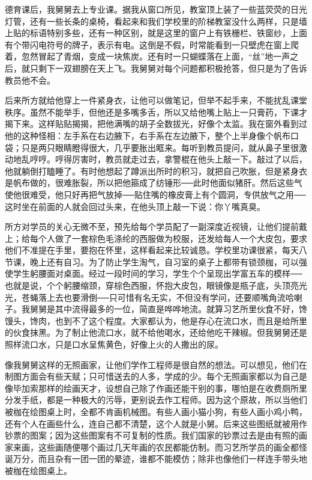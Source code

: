 德育课后，我舅舅去上专业课。据我从窗口所见，教室顶上装了一些蓝荧荧的日光灯管，还有一些长条的桌椅，看起来和我们学校里的阶梯教室没什么两样，只是墙上贴的标语特别多些，还有一种区别，就是这里的窗户上有铁栅栏、铁窗纱，上面有个带闪电符号的牌子，表示有电。这倒是不假，时常能看到一只壁虎在窗上爬着，忽然冒起了青烟，变成一块焦炭。还有时一只蝴蝶落在上面，“丝”地一声之后，就只剩下一双翅膀在天上飞。我舅舅对每个问题都积极抢答，但只是为了告诉教员他不会。 

后来所方就给他穿上一件紧身衣，让他可以做笔记，但举不起手来，不能扰乱课堂秩序。虽然不能举手，但他还是多嘴多舌，所以又给他嘴上贴上一只膏药，下课才揭下来。这样贴贴揭揭，把他满嘴的胡子全数拔光，好像个太监。我在窗外看到过他的这种怪相：左手系在右边腋下，右手系在左边腋下，整个上半身像个帆布口袋；只是两只眼睛瞪得很大，几乎要胀出眶来。每听到教员提问，就从鼻子里很激动地乱哼哼。哼得厉害时，教员就走过去，拿警棍在他头上敲一下。敲过了以后，他就躺倒打瞌睡了。有时他想起了蹲派出所时的积习，就把自己吹胀，但是紧身衣是帆布做的，很难胀裂，所以把他箍成了纺锤形──此时他面似猪肝。然后这些气使他很难受，他只好再把气放掉──贴住嘴的橡皮膏上有个圆洞，专供放气之用──这时坐在前面的人就会回过头来，在他头顶上敲一下说：你丫嘴真臭。 

所方对学员的关心无微不至，预先给每个学员配了一副深度近视镜，让他们提前戴上；给每个人做了一套棕色毛涤纶的西服做为校服，还发给每人一个大皮包，要求他们不准提在手里，要抱在怀里，这样看起来比较诚恳。学校里功课很紧，每天八节课，晚上还有自习。为了防止学生淘气，自习室的桌子上都带有锁颈枷，可以强使学生躬腰面对桌面。经过一段时间的学习，学生个个呈现出学富五车的模样──也就是说，个个躬腰缩颈，穿棕色西服，怀抱大皮包，眼镜像是瓶子底，头顶亮光光，苍蝇落上去也要滑倒──只可惜有名无实，不但没有学问，还要顺嘴角流哈喇子。我舅舅是其中流得最多的一位，简直是哗哗地流。就算习艺所里伙食不好，馋馒头，馋肉，也到不了这个程度。大家都认为，他是存心在流口水，而且是给所里的伙食抹黑。为了制止他流口水，就不给他喝水，还给他吃干辣椒。但我舅舅还是照样流口水，只是口水呈焦黄色，好像上火的人撒出的尿。 

像我舅舅这样的无照画家，让他们学作工程师是很自然的想法。可以想见，他们在制图方面会有些天赋；只可惜送去的人多，学成的少。每个无照画家都以为自己是像毕加索那样的绘画天才，设想自己除了作画还能干别的事，哪怕是在收费厕所里分发手纸，都是一种极大的污辱，更别说去作工程师。因为这个原故，所以当他们被枷在绘图桌上时，全都不肯画机械图。有些人画小猫小狗，有些人画小鸡小鸭，还有个人在画些什么，连自己都不清楚，这个人就是小舅。后来这些图纸就被用作钞票的图案；因为这些图案有不可复制的性质。我们国家的钞票过去是由有照的画家来画，这些画随便哪个画过几天年画的农民都能仿制。而习艺所学员的画全都怪诞万分，而且杂有一团一团的晕迹，谁都不能模仿；除非也像他们一样连手带头地被枷在绘图桌上。 

